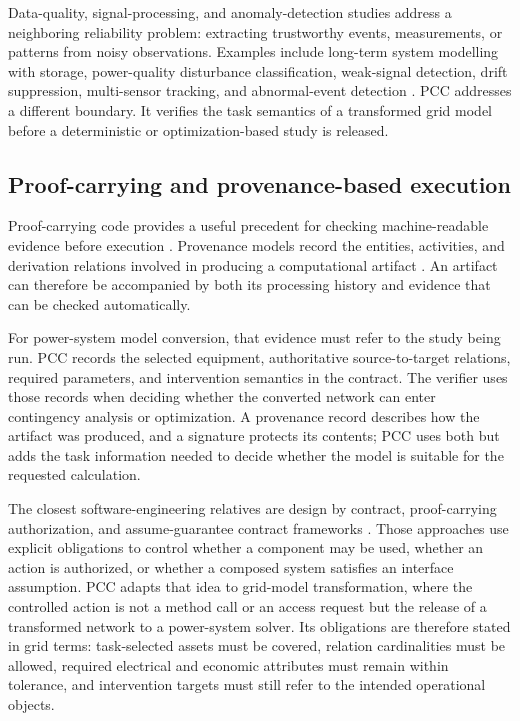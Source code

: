 \documentclass[preprint,12pt]{elsarticle}
\begin{document}
Data-quality, signal-processing, and anomaly-detection studies address a neighboring reliability problem: extracting trustworthy events, measurements, or patterns from noisy observations. Examples include long-term system modelling with storage, power-quality disturbance classification, weak-signal detection, drift suppression, multi-sensor tracking, and abnormal-event detection \citep{lai2021longterm,dsp_pqd_2022,dsp_pqd_2024,dsp_weak_2023,dsp_weak_2024,dsp_drift_2024,dsp_track_2025,dsp_video_2026,dsp_yolo_2026}. PCC addresses a different boundary. It verifies the task semantics of a transformed grid model before a deterministic or optimization-based study is released.

\subsection{Proof-carrying and provenance-based execution}

Proof-carrying code provides a useful precedent for checking machine-readable evidence before execution \citep{necula1997pcc}. Provenance models record the entities, activities, and derivation relations involved in producing a computational artifact \citep{prov2013,provdm2013,prov_overview}. An artifact can therefore be accompanied by both its processing history and evidence that can be checked automatically.

For power-system model conversion, that evidence must refer to the study being run. PCC records the selected equipment, authoritative source-to-target relations, required parameters, and intervention semantics in the contract. The verifier uses those records when deciding whether the converted network can enter contingency analysis or optimization. A provenance record describes how the artifact was produced, and a signature protects its contents; PCC uses both but adds the task information needed to decide whether the model is suitable for the requested calculation.

The closest software-engineering relatives are design by contract, proof-carrying authorization, and assume-guarantee contract frameworks \citep{meyer1992dbc,appel1999pca,sangiovanni2012contract,benveniste2018contracts}. Those approaches use explicit obligations to control whether a component may be used, whether an action is authorized, or whether a composed system satisfies an interface assumption. PCC adapts that idea to grid-model transformation, where the controlled action is not a method call or an access request but the release of a transformed network to a power-system solver. Its obligations are therefore stated in grid terms: task-selected assets must be covered, relation cardinalities must be allowed, required electrical and economic attributes must remain within tolerance, and intervention targets must still refer to the intended operational objects.
\end{document}
